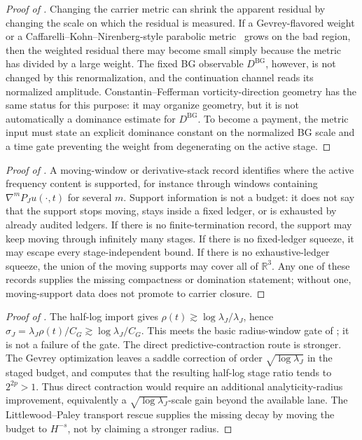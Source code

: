 \documentclass[11pt]{article}
\newcommand{\DBG}{D^{\mathrm{BG}}}
\newcommand{\CG}{C_G}
\newcommand{\sigmaJ}{\sigma_J}
\newcommand{\lambdaJ}{\lambda_J}
\theoremstyle{definition}
\begin{document}
\begin{proof}[Proof of ]
Changing the carrier metric can shrink the apparent residual by
changing the scale on which the residual is measured.  If a
Gevrey-flavored weight or a Caffarelli--Kohn--Nirenberg-style parabolic
metric~\citep[and the later refinements
of][]{Lin1998CKN,Vasseur2007PartialReg} grows on the bad region, then
the weighted residual there may become small simply because the metric
has divided by a large weight.  The fixed BG observable \(\DBG\),
however, is not changed by this renormalization, and the continuation
channel reads its normalized amplitude.  Constantin--Fefferman
vorticity-direction geometry has the same status for this purpose: it
may organize geometry, but it is not automatically a dominance
estimate for \(\DBG\).  To become a payment, the metric input must
state an explicit dominance constant on the normalized BG scale and a
time gate preventing the weight from degenerating on the active stage.
\end{proof}

\begin{proof}[Proof of ]
A moving-window or derivative-stack record identifies where the active
frequency content is supported, for instance through windows containing
\(\nabla^mP_Ju(\cdot,t)\) for several \(m\).  Support information is
not a budget: it does not say that the support stops moving, stays
inside a fixed ledger, or is exhausted by already audited ledgers.  If
there is no finite-termination record, the support may keep moving
through infinitely many stages.  If there is no fixed-ledger squeeze,
it may escape every stage-independent bound.  If there is no
exhaustive-ledger squeeze, the union of the moving supports may cover
all of \(\mathbb R^3\).  Any one of these records supplies the missing
compactness or domination statement; without one, moving-support data
does not promote to carrier closure.
\end{proof}

\begin{proof}[Proof of ]
The half-log import gives
\(\rho(t)\gtrsim \log\lambdaJ/\lambdaJ\), hence
\(\sigmaJ=\lambdaJ\rho(t)/\CG\gtrsim \log\lambdaJ/\CG\).  This meets
the basic radius-window gate of ; it is
not a failure of the gate.  The direct predictive-contraction route is
stronger.  The Gevrey optimization leaves a saddle correction of order
\(\sqrt{\log\lambdaJ}\) in the staged budget, and
 computes that the resulting
half-log stage ratio tends to \(2^{2p}>1\).  Thus direct contraction
would require an additional analyticity-radius improvement, equivalently
a \(\sqrt{\log\lambdaJ}\)-scale gain beyond the available lane.  The
Littlewood--Paley transport rescue supplies the missing decay by moving
the budget to \(H^{-s}\), not by claiming a stronger radius.
\end{proof}
\end{document}
